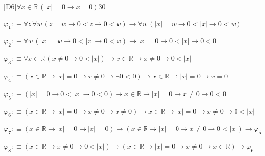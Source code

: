 \begin{fullproof}{[D6]}{$\forall x \in \mathbb{R}\,(\lvert x \rvert = 0 \to x = 0)$}{30}
\begin{ptree}
\end{ptree}
\begin{abbrevlist}
\item $\varphi_{1} :\equiv \forall z\,\forall w\,(z = w \to 0 < z \to 0 < w) \to \forall w\,(\lvert x \rvert = w \to 0 < \lvert x \rvert \to 0 < w)$
\item $\varphi_{2} :\equiv \forall w\,(\lvert x \rvert = w \to 0 < \lvert x \rvert \to 0 < w) \to \lvert x \rvert = 0 \to 0 < \lvert x \rvert \to 0 < 0$
\item $\varphi_{3} :\equiv \forall x \in \mathbb{R}\,(x \neq 0 \to 0 < \lvert x \rvert) \to x \in \mathbb{R} \to x \neq 0 \to 0 < \lvert x \rvert$
\item $\varphi_{4} :\equiv (x \in \mathbb{R} \to \lvert x \rvert = 0 \to x \neq 0 \to \neg 0 < 0) \to x \in \mathbb{R} \to \lvert x \rvert = 0 \to x = 0$
\item $\varphi_{5} :\equiv (\lvert x \rvert = 0 \to 0 < \lvert x \rvert \to 0 < 0) \to x \in \mathbb{R} \to \lvert x \rvert = 0 \to x \neq 0 \to 0 < 0$
\item $\varphi_{6} :\equiv (x \in \mathbb{R} \to \lvert x \rvert = 0 \to x \neq 0 \to x \neq 0) \to x \in \mathbb{R} \to \lvert x \rvert = 0 \to x \neq 0 \to 0 < \lvert x \rvert$
\item $\varphi_{7} :\equiv (x \in \mathbb{R} \to \lvert x \rvert = 0 \to \lvert x \rvert = 0) \to (x \in \mathbb{R} \to \lvert x \rvert = 0 \to x \neq 0 \to 0 < \lvert x \rvert) \to \varphi_{5}$
\item $\varphi_{8} :\equiv (x \in \mathbb{R} \to x \neq 0 \to 0 < \lvert x \rvert) \to (x \in \mathbb{R} \to \lvert x \rvert = 0 \to x \neq 0 \to x \in \mathbb{R}) \to \varphi_{6}$
\end{abbrevlist}
\end{fullproof}
